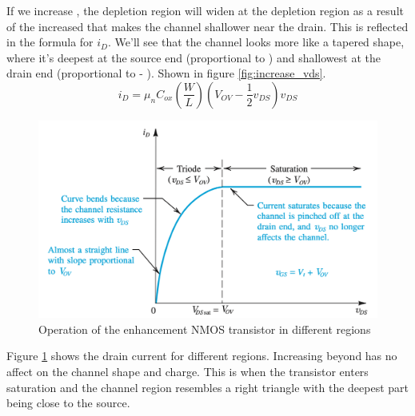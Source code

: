 If we increase \vds, the depletion region will widen at the depletion region as a result of the increased \vds that makes the channel shallower near the drain. This is reflected in the formula for $i_D$. We'll see that the channel looks more like a tapered shape, where it's deepest at the source end (proportional to \vov) and shallowest at the drain end (proportional to \vov - \vds). Shown in figure \ref{fig:increase_vds}.
\[i_D = \mu_n C_{ox} (\frac{W}{L}) (V_{OV} - \frac{1}{2}v_{DS})v_{DS}\]

\begin{figure}[htb]
    \centering
    \includegraphics[scale=0.5]{figs/ch05/pinch_off.png}
    \caption{Operation of the enhancement NMOS transistor in different regions}
    \label{fig:pinch}
\end{figure}

Figure \ref{fig:pinch} shows the drain current for different regions. Increasing \vds beyond \vov has no affect on the channel shape and charge. This is when the transistor enters saturation and the channel region resembles a right triangle with the deepest part being close to the source.

